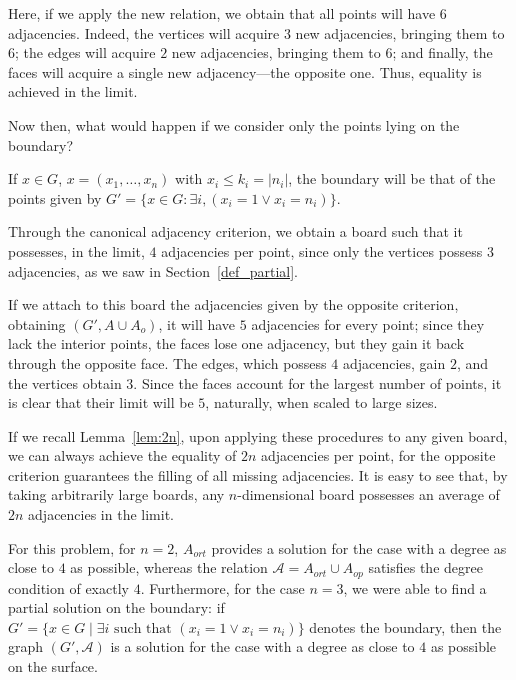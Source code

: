 Here, if we apply the new relation, we obtain that all points will have $6$ adjacencies. Indeed, the vertices will acquire $3$ new adjacencies, bringing them to $6$; the edges will acquire $2$ new adjacencies, bringing them to $6$; and finally, the faces will acquire a single new adjacency—the opposite one. Thus, equality is achieved in the limit.

Now then, what would happen if we consider only the points lying on the boundary?

\noindent
If \(x\in G\), \(x=(x_1,\dots,x_n)\) with \(x_i \leq k_i=|n_i|\), the boundary will be that of the points given by \(G'=\{x\in G: \exists i, (x_i= 1 \lor x_i =n_i) \}\).

Through the canonical adjacency criterion, we obtain a board such that it possesses, in the limit, $4$ adjacencies per point, since only the vertices possess $3$ adjacencies, as we saw in Section~\ref{def_partial}.

If we attach to this board the adjacencies given by the opposite criterion, obtaining \((G',A\cup A_o)\), it will have $5$ adjacencies for every point; since they lack the interior points, the faces lose one adjacency, but they gain it back through the opposite face. The edges, which possess $4$ adjacencies, gain $2$, and the vertices obtain $3$. Since the faces account for the largest number of points, it is clear that their limit will be $5$, naturally, when scaled to large sizes.

If we recall Lemma~\ref{lem:2n}, upon applying these procedures to any given board, we can always achieve the equality of $2n$ adjacencies per point, for the opposite criterion guarantees the filling of all missing adjacencies. It is easy to see that, by taking arbitrarily large boards, any \(n\)-dimensional board possesses an average of $2n$ adjacencies in the limit.

For this problem, for \(n=2\), \(A_{ort}\) provides a solution for the case with a degree as close to $4$ as possible, whereas the relation \(\mathcal{A} = A_{ort} \cup A_{{op}}\) satisfies the degree condition of exactly $4$. Furthermore, for the case \(n = 3\), we were able to find a partial solution on the boundary: if \(G' = \{ x \in G \mid \exists i \text{ such that } (x_i = 1 \lor x_i = n_i) \}\) denotes the boundary, then the graph \((G', \mathcal{A} )\) is a solution for the case with a degree as close to $4$ as possible on the surface.

